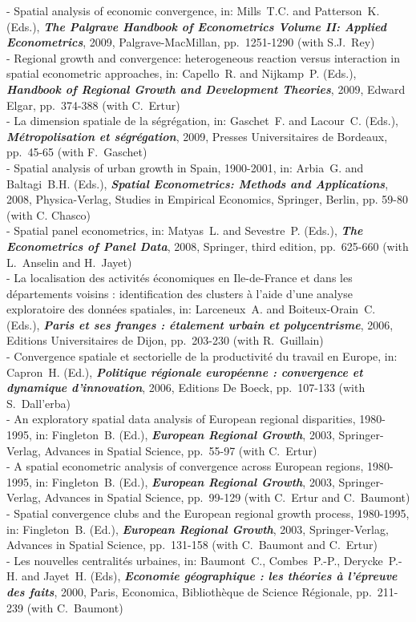\documentclass[a4paper,12pt]{article}
\begin{document}
- Spatial analysis of economic convergence, in: Mills~T.C. and Patterson~K. (Eds.), \textit{\textbf{The Palgrave Handbook of Econometrics Volume II: Applied Econometrics}}, 2009, Palgrave-MacMillan, pp.~1251-1290 (with S.J.~Rey) \\
- Regional growth and convergence: heterogeneous reaction versus interaction in spatial econometric approaches, in: Capello~R. and Nijkamp~P. (Eds.), \textit{\textbf{Handbook of Regional Growth and Development Theories}}, 2009, Edward Elgar, pp.~374-388 (with C.~Ertur) \\
- La dimension spatiale de la ségrégation, in: Gaschet~F. and Lacour~C. (Eds.), \textit{\textbf{Métropolisation et ségrégation}}, 2009, Presses Universitaires de Bordeaux, pp.~45-65 (with F.~Gaschet) \\
- Spatial analysis of urban growth in Spain, 1900-2001, in: Arbia~G. and Baltagi~B.H. (Eds.), \textit{\textbf{Spatial Econometrics: Methods and Applications}}, 2008, Physica-Verlag, Studies in Empirical Economics, Springer, Berlin, pp. 59-80 (with C. Chasco) \\
- Spatial panel econometrics, in: Matyas~L. and Sevestre~P. (Eds.), \textit{\textbf{The Econometrics of Panel Data}}, 2008, Springer, third edition, pp.~625-660 (with L.~Anselin and H.~Jayet) \\
- La localisation des activités économiques en Ile-de-France et dans les départements voisins : identification des clusters à l'aide d'une analyse exploratoire des données spatiales, in: Larceneux~A. and Boiteux-Orain~C. (Eds.), \textit{\textbf{Paris et ses franges : étalement urbain et polycentrisme}}, 2006, Editions Universitaires de Dijon, pp.~203-230 (with R.~Guillain) \\
- Convergence spatiale et sectorielle de la productivité du travail en Europe, in: Capron~H. (Ed.), \textit{\textbf{Politique régionale européenne : convergence et dynamique d'innovation}}, 2006, Editions De Boeck, pp.~107-133 (with S.~Dall'erba) \\
- An exploratory spatial data analysis of European regional disparities, 1980-1995, in: Fingleton~B. (Ed.), \textit{\textbf{European Regional Growth}}, 2003, Springer-Verlag, Advances in Spatial Science, pp.~55-97 (with C.~Ertur) \\
- A spatial econometric analysis of convergence across European regions, 1980-1995, in: Fingleton~B. (Ed.), \textit{\textbf{European Regional Growth}}, 2003, Springer-Verlag, Advances in Spatial Science, pp.~99-129 (with C.~Ertur and C.~Baumont) \\
- Spatial convergence clubs and the European regional growth process, 1980-1995, in: Fingleton~B. (Ed.), \textit{\textbf{European Regional Growth}}, 2003, Springer-Verlag, Advances in Spatial Science, pp.~131-158 (with C.~Baumont and C.~Ertur) \\
- Les nouvelles centralités urbaines, in: Baumont~C., Combes~P.-P., Derycke~P.-H. and Jayet~H. (Eds), \textit{\textbf{Economie géographique : les théories à l'épreuve des faits}}, 2000, Paris, Economica, Bibliothèque de Science Régionale, pp.~211-239 (with C.~Baumont) \\
\end{document}
